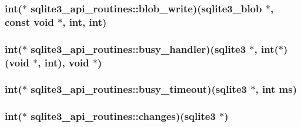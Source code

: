 \hypertarget{structsqlite3__api__routines_a49a8e111c2b4f033b93820e0199a653e}{
\subsubsection[{blob\-\_\-write}]{\setlength{\rightskip}{0pt plus 5cm}int($\ast$ sqlite3\-\_\-api\-\_\-routines\-::blob\-\_\-write)({\bf sqlite3\-\_\-blob} $\ast$, const void $\ast$, int, int)}}\label{structsqlite3__api__routines_a49a8e111c2b4f033b93820e0199a653e}
\hypertarget{structsqlite3__api__routines_a4dd578712242bb36acf8568f1c0da278}{
\subsubsection[{busy\-\_\-handler}]{\setlength{\rightskip}{0pt plus 5cm}int($\ast$ sqlite3\-\_\-api\-\_\-routines\-::busy\-\_\-handler)({\bf sqlite3} $\ast$, int($\ast$)(void $\ast$, int), void $\ast$)}}\label{structsqlite3__api__routines_a4dd578712242bb36acf8568f1c0da278}
\hypertarget{structsqlite3__api__routines_a403a82d983e3a60444761e4f78d6269c}{
\subsubsection[{busy\-\_\-timeout}]{\setlength{\rightskip}{0pt plus 5cm}int($\ast$ sqlite3\-\_\-api\-\_\-routines\-::busy\-\_\-timeout)({\bf sqlite3} $\ast$, int ms)}}\label{structsqlite3__api__routines_a403a82d983e3a60444761e4f78d6269c}
\hypertarget{structsqlite3__api__routines_a1379bef0cb6e5e352dc26a34e2d02477}{
\subsubsection[{changes}]{\setlength{\rightskip}{0pt plus 5cm}int($\ast$ sqlite3\-\_\-api\-\_\-routines\-::changes)({\bf sqlite3} $\ast$)}}\label{structsqlite3__api__routines_a1379bef0cb6e5e352dc26a34e2d02477}
